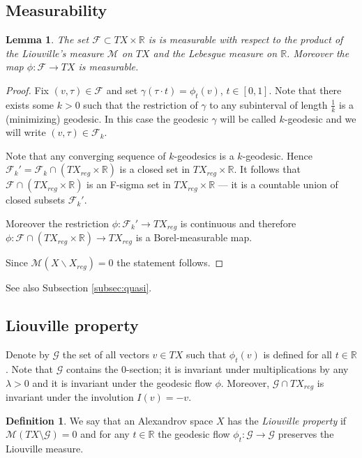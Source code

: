 \documentclass[12pt,leqno,intlimits]{amsart}
\numberwithin{equation}{section}
\newtheorem{lem}[thm]{Lemma}
\theoremstyle{definition}
\newtheorem{defn}[thm]{Definition}%
\theoremstyle{remark}
\newcommand{\R}{\mathbb{R}}
\def\:{\colon}
\begin{document}
{\color{red}

\subsection{Measurability} \label{subsec:measur}

\begin{lem}\label{lem:measurability}
The set $\mathcal F\subset TX\times \R$ is
is measurable with respect to the product of the Liouville's measure $\mathcal M$ on $TX$ and the Lebesgue measure on $\R$.
Moreover the map $\phi \:\mathcal F \to TX$ is measurable.
\end{lem}

\begin{proof}
Fix $(v,\tau)\in \mathcal F$ and set $\gamma(\tau\cdot t)=\phi_t(v)$, $t\in[0,1]$.
Note that there exists some $k>0$ such that the restriction of $\gamma$ to any subinterval of length $\frac 1 k$ is a (minimizing) geodesic.
In this case the geodesic $\gamma$ will be called $k$-geodesic and
we will write $(v,\tau)\in \mathcal F_k$.

Note that any converging sequence of $k$-geodesics is a $k$-geodesic.
Hence $\mathcal F_k'=\mathcal F_k\cap (TX_{reg} \times \R)$ is a closed set in $TX_{reg} \times \R$.
It follows that $\mathcal F\cap (TX_{reg} \times \R)$ is an F-sigma set in $TX_{reg} \times \R$ --- it is a countable union of closed subsets $\mathcal F_k'$.

Moreover the restriction $\phi\: \mathcal F_k' \to TX_{reg}$ is continuous and therefore
$\phi \:\mathcal F\cap (TX_{reg} \times \R) \to TX_{reg}$ is a Borel-measurable map.

Since $\mathcal M(X\backslash X_{reg})=0$ the statement follows.
\end{proof}

See also Subsection \ref{subsec:quasi}.
}

\subsection{Liouville property}
Denote by $\mathcal G$ the set of all vectors $v\in TX $ such that $\phi _t(v)$ is defined for all $t\in \R$.
Note that $\mathcal G$ contains the $0$-section;
it is invariant under multiplications by any $\lambda>0$
and it is invariant under the geodesic flow $\phi$.
Moreover, $\mathcal G\cap TX_{reg}$ is invariant under the involution $I (v)=-v$.

\begin{defn}
We say that an Alexandrov space $X$ has the \emph{Liouville property} if $\mathcal M(TX\setminus \mathcal G)=0$ and
for any $t\in \R$ the geodesic flow $\phi _t \:\mathcal G\to \mathcal G$ preserves the Liouville measure.
\end{defn}
\end{document}
